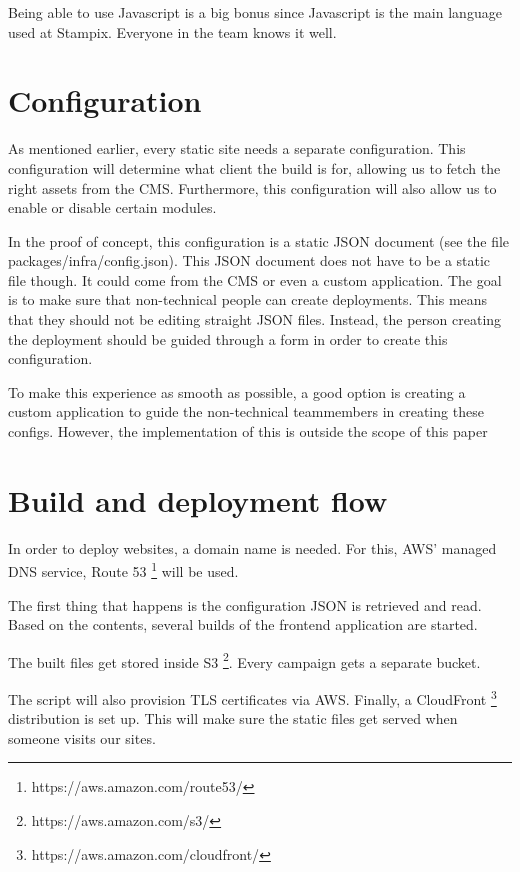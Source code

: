Being able to use Javascript is a big bonus since Javascript is the main language used at Stampix. Everyone in the team knows it well.

\section{Configuration}

As mentioned earlier, every static site needs a separate configuration. 
This configuration will determine what client the build is for, allowing us to fetch the right assets from the CMS. 
Furthermore, this configuration will also allow us to enable or disable certain modules. 

In the proof of concept, this configuration is a static JSON document (see the file packages/infra/config.json). This JSON document does not have to be a static file though. 
It could come from the CMS or even a custom application. 
The goal is to make sure that non-technical people can create deployments. This means that they should not be editing straight JSON files.
Instead, the person creating the deployment should be guided through a form in order to create this configuration. 

To make this experience as smooth as possible, a good option is creating a custom application to guide the non-technical teammembers in creating these configs. 
However, the implementation of this is outside the scope of this paper

\section{Build and deployment flow}

In order to deploy websites, a domain name is needed. For this, AWS' managed DNS service, Route 53 \footnote{https://aws.amazon.com/route53/} will be used.

The first thing that happens is the configuration JSON is retrieved and read. Based on the contents, several builds of the frontend application are started.

The built files get stored inside S3 \footnote{https://aws.amazon.com/s3/}. Every campaign gets a separate bucket.

The script will also provision TLS certificates via AWS. 
Finally, a CloudFront \footnote{https://aws.amazon.com/cloudfront/} distribution is set up. This will make sure the static files get served when someone visits our sites.